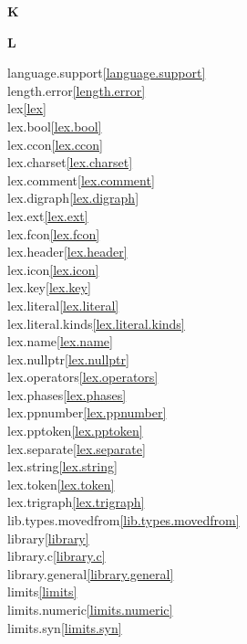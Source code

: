 \begin{multicols}{2}
\par \textbf{K}\par
\par \textbf{L}\par
language.support\quad\ref{language.support}\\
length.error\quad\ref{length.error}\\
lex\quad\ref{lex}\\
lex.bool\quad\ref{lex.bool}\\
lex.ccon\quad\ref{lex.ccon}\\
lex.charset\quad\ref{lex.charset}\\
lex.comment\quad\ref{lex.comment}\\
lex.digraph\quad\ref{lex.digraph}\\
lex.ext\quad\ref{lex.ext}\\
lex.fcon\quad\ref{lex.fcon}\\
lex.header\quad\ref{lex.header}\\
lex.icon\quad\ref{lex.icon}\\
lex.key\quad\ref{lex.key}\\
lex.literal\quad\ref{lex.literal}\\
lex.literal.kinds\quad\ref{lex.literal.kinds}\\
lex.name\quad\ref{lex.name}\\
lex.nullptr\quad\ref{lex.nullptr}\\
lex.operators\quad\ref{lex.operators}\\
lex.phases\quad\ref{lex.phases}\\
lex.ppnumber\quad\ref{lex.ppnumber}\\
lex.pptoken\quad\ref{lex.pptoken}\\
lex.separate\quad\ref{lex.separate}\\
lex.string\quad\ref{lex.string}\\
lex.token\quad\ref{lex.token}\\
lex.trigraph\quad\ref{lex.trigraph}\\
lib.types.movedfrom\quad\ref{lib.types.movedfrom}\\
library\quad\ref{library}\\
library.c\quad\ref{library.c}\\
library.general\quad\ref{library.general}\\
limits\quad\ref{limits}\\
limits.numeric\quad\ref{limits.numeric}\\
limits.syn\quad\ref{limits.syn}\\

\end{multicols}
